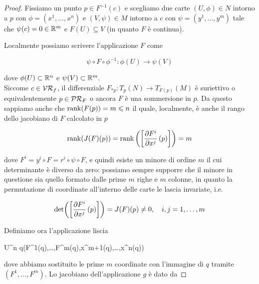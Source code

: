 \begin{proof}
	Fissiamo un punto $ p \in F^{-1}(c) $ e scegliamo due carte $ (U,\phi) \in N $ intorno a $ p $ con $ \phi = (x^{1},\dots,x^{n}) $ e $ (V,\psi) \in M $ intorno a $ c $ con $ \psi = (y^{1},\dots,y^{m}) $ tale che $ \psi(c)=0 \in \mathbb{R}^{m} $ e $ F(U) \subseteq V $ (in quanto $ F $ è continua).
	

	Localmente possiamo scrivere l'applicazione $ F $ come
	
	\begin{equation}
		\psi \circ F \circ \phi^{-1} : \phi(U) \to \psi(V)
	\end{equation}

	dove $ \phi(U) \subset \mathbb{R}^{n} $ e $ \psi(V) \subset \mathbb{R}^{m} $.\\
	Siccome $ c \in \mathcal{VR}_{f} $, il differenziale $ F_{*p} : T_{p}(N) \to T_{F(p)}(M) $ è suriettivo o equivalentemente $ p \in \mathcal{PR}_{F} $ o ancora $ F $ è una sommersione in $ p $. Da questo sappiamo anche che $ \rank(F(p)) = m \leqslant n $ il quale, localmente, è anche il rango dello jacobiano di $ F $ calcolato in $ p $
	
	\begin{equation}
		\rank(J(F)(p)) = \rank \left( \left[ \pdv{F^{i}}{x^{j}} \, (p) \right] \right) = m
	\end{equation}

	dove $ F^{i} = y^{i} \circ F = r^{i} \circ \psi \circ F $, e quindi esiste un minore di ordine $ m $ il cui determinante è diverso da zero: possiamo sempre supporre che il minore in questione sia quello formato dalle prime $ m $ righe e $ m $ colonne, in quanto la permutazione di coordinate all'interno delle carte le lascia invariate, i.e.
	
	\begin{equation}
		\det( \left[ \pdv{F^{i}}{x^{j}} \, (p) \right] ) = J(F)(p) \neq 0 \qcomma i,j=1,\dots,m
	\end{equation}

	Definiamo ora l'applicazione liscia
	
		{U}{\R^{n}}
		{q}{(F^{1}(q),\dots,F^{m}(q),x^{m+1}(q),\dots,x^{n}(q))}

	dove abbiamo sostituito le prime $ m $ coordinate con l'immagine di $ q $ tramite $ (F^{1},\dots,F^{m}) $. Lo jacobiano dell'applicazione $ g $ è dato da
	

\end{proof}
